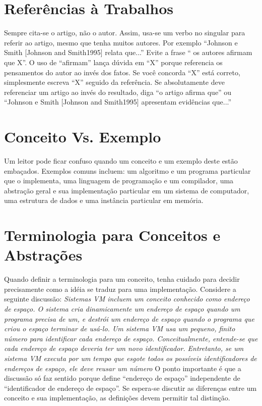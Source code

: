 \section{Referências à Trabalhos}

Sempre cita-se o artigo, não o autor. Assim, usa-se um verbo no singular para referir ao artigo, mesmo que tenha muitos autores. Por exemplo ``Johnson e Smith [Johnson and Smith1995] relata que...''
Evite a frase `` os autores afirmam que X''. O uso de ``afirmam'' lança dúvida em ``X'' porque referencia os pensamentos do autor ao invés dos fatos. Se você concorda ``X'' está correto, simplesmente escreva ``X'' seguido da referência. Se absolutamente deve referenciar um artigo ao invés do resultado, diga ``o artigo afirma que'' ou ``Johnson e Smith [Johnson and Smith1995] apresentam evidências que...''

\section{Conceito Vs. Exemplo}

Um leitor pode ficar confuso quando um conceito e um exemplo deste estão embaçados. 
Exemplos comuns incluem: um algoritmo e um programa particular que o implementa, uma linguagem de programação e um compilador, uma abstração geral e sua implementação 
particular em um sistema de computador, uma estrutura de dados e uma instância particular em memória.

\section{Terminologia para Conceitos e Abstrações}

Quando definir a terminologia para um conceito, tenha cuidado para decidir precisamente como a idéia se traduz para uma implementação. Considere a seguinte discussão:
\textit{Sistemas VM incluem um conceito conhecido como endereço de espaço. O sistema cria dinamicamente um endereço de espaço quando um programa precisa de um, e destrói um endereço de espaço 
quando o programa que criou o espaço terminar de usá-lo. Um sistema VM usa um pequeno, finito número para identificar cada endereço de espaço. 
Conceitualmente, entende-se que cada endereço de espaço deveria ter um novo identificador. Entretanto, se um sistema VM executa por um tempo que esgote todos os possíveis identificadores de endereços de espaço, 
ele deve reusar um número}
O ponto importante é que a discussão só faz sentido porque define ``endereço de espaço'' independente de ``identificador de endereço de espaço''. 
Se espera-se discutir as diferenças entre um conceito e sua implementação, as definições devem permitir tal distinção.

